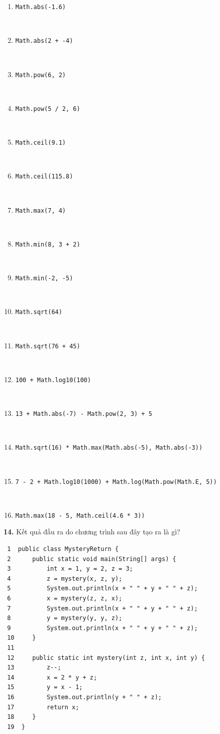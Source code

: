 \begin{enumerate}
\def\labelenumi{\alph{enumi}.}
\tightlist
\item
  \texttt{Math.abs(-1.6)}\strut \\
\item
  \texttt{Math.abs(2\ +\ -4)}\strut \\
\item
  \texttt{Math.pow(6,\ 2)}\strut \\
\item
  \texttt{Math.pow(5\ /\ 2,\ 6)}\strut \\
\item
  \texttt{Math.ceil(9.1)}\strut \\
\item
  \texttt{Math.ceil(115.8)}\strut \\
\item
  \texttt{Math.max(7,\ 4)}\strut \\
\item
  \texttt{Math.min(8,\ 3\ +\ 2)}\strut \\
\item
  \texttt{Math.min(-2,\ -5)}\strut \\
\item
  \texttt{Math.sqrt(64)}\strut \\
\item
  \texttt{Math.sqrt(76\ +\ 45)}\strut \\
\item
  \texttt{100\ +\ Math.log10(100)}\strut \\
\item
  \texttt{13\ +\ Math.abs(-7)\ -\ Math.pow(2,\ 3)\ +\ 5}\strut \\
\item
  \texttt{Math.sqrt(16)\ *\ Math.max(Math.abs(-5),\ Math.abs(-3))}\strut \\
\item
  \texttt{7\ -\ 2\ +\ Math.log10(1000)\ +\ Math.log(Math.pow(Math.E,\ 5))}\strut \\
\item
  \texttt{Math.max(18\ -\ 5,\ Math.ceil(4.6\ *\ 3))}
\end{enumerate}

\textbf{14.} Kết quả đầu ra do chương trình sau đây tạo ra là gì?

\begin{verbatim}
 1  public class MysteryReturn {
 2      public static void main(String[] args) {
 3          int x = 1, y = 2, z = 3;
 4          z = mystery(x, z, y);
 5          System.out.println(x + " " + y + " " + z);
 6          x = mystery(z, z, x);
 7          System.out.println(x + " " + y + " " + z);
 8          y = mystery(y, y, z);
 9          System.out.println(x + " " + y + " " + z);
 10     }
 11
 12     public static int mystery(int z, int x, int y) {
 13         z--;
 14         x = 2 * y + z;
 15         y = x - 1;
 16         System.out.println(y + " " + z);
 17         return x;
 18     }
 19  }
\end{verbatim}

